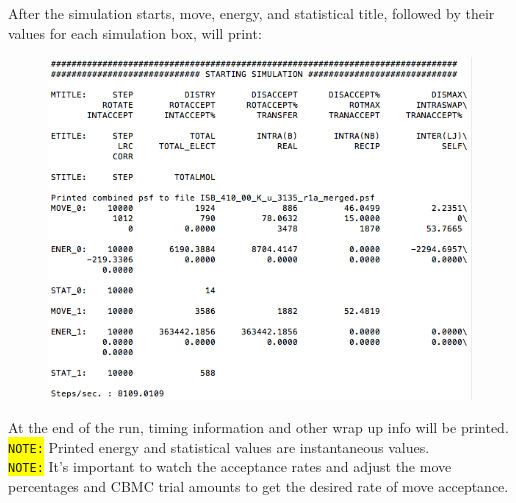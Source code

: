 After the simulation starts, move, energy, and statistical title, followed by their values for each simulation box, will print:
\begin{figure}[H]
\includegraphics[scale=1]{images/out4}
\end{figure}
At the end of the run, timing information and other wrap up info will be printed.\\
\colorbox{yellow}{\texttt{NOTE:}} Printed energy and statistical values are instantaneous values.\\
\colorbox{yellow}{\texttt{NOTE:}} It's important to watch the acceptance rates and adjust the move percentages and CBMC trial amounts to get the desired rate of move acceptance.
